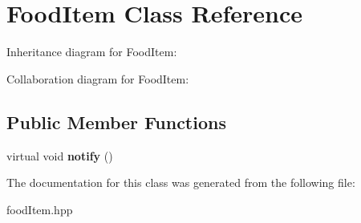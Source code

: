 \hypertarget{classFoodItem}{}\section{Food\+Item Class Reference}
\label{classFoodItem}


Inheritance diagram for Food\+Item\+:


Collaboration diagram for Food\+Item\+:
\subsection*{Public Member Functions}
\begin{DoxyCompactItemize}
\item 
virtual void {\bfseries notify} ()\hypertarget{classFoodItem_ad7c00abb43b23475db4e60c87f98eb86}{}\label{classFoodItem_ad7c00abb43b23475db4e60c87f98eb86}

\end{DoxyCompactItemize}


The documentation for this class was generated from the following file\+:\begin{DoxyCompactItemize}
\item 
food\+Item.\+hpp\end{DoxyCompactItemize}
